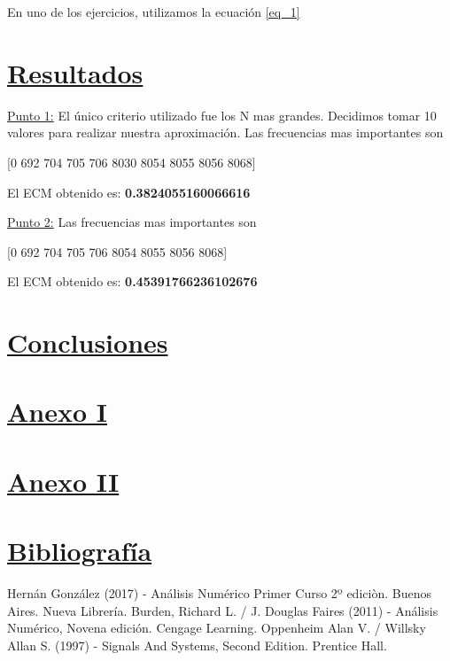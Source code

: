 \documentclass[10pt,a4paper]{article}
\numberwithin{equation}{section}
\numberwithin{figure}{section}
\numberwithin{table}{section}
\begin{document}
En uno de los ejercicios, utilizamos la ecuación \ref*{eq_1}









    
\section{\underline{Resultados}}
\underline{Punto 1:}
El único criterio utilizado fue los N mas grandes.
Decidimos tomar 10 valores para realizar nuestra aproximación. Las frecuencias mas importantes son

\begin{center}
    [0  692  704  705  706 8030 8054 8055 8056 8068]
\end{center}

El ECM obtenido es: \textbf{0.3824055160066616}


\underline{Punto 2:}
Las frecuencias mas importantes son
\begin{center}
    [0  692  704  705  706 8054 8055 8056 8068]
\end{center}

El ECM obtenido es: \textbf{0.45391766236102676}


\section{\underline{Conclusiones}}

\section{\underline{Anexo I}}

\section{\underline{Anexo II}}


\section{\underline{Bibliografía}}
\begin{thebibliography}{9}

Hernán González (2017) - Análisis Numérico Primer Curso 2º ediciòn. Buenos Aires. Nueva Librería. 
Burden, Richard L. / J. Douglas Faires (2011) - Análisis Numérico, Novena edición. Cengage Learning.
Oppenheim Alan V. / Willsky Allan S. (1997) - Signals And Systems, Second Edition. Prentice Hall.
\end{thebibliography}
\end{document}
